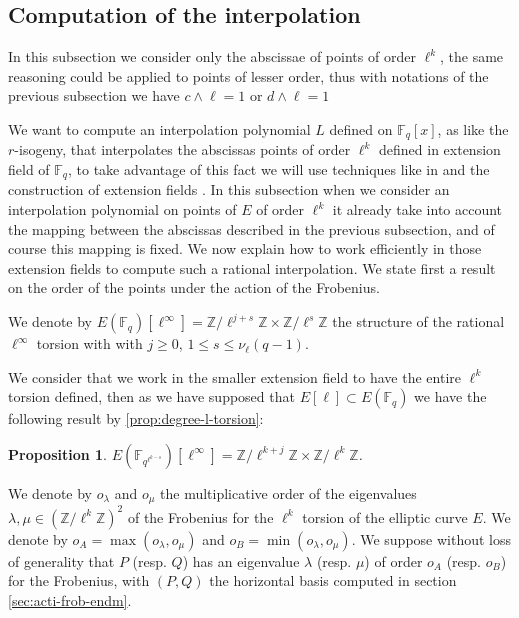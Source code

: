 \documentclass{lms}
\newtheorem{prop}[thm]{Proposition}
\begin{document}

\subsection{Computation of the interpolation}
In this subsection we consider only the abscissae of points of order $\ell^k$, the same reasoning could be applied to points of lesser order, thus with notations of the previous subsection we have $c \wedge \ell =1$ or $d \wedge \ell =1$ 

We want to compute an interpolation polynomial $L$ defined on $\mathbb{F}_q[x]$, as like the $r$-isogeny, that interpolates the abscissas points of order $\ell^k$ defined in extension field of $\mathbb{F}_q$, to take advantage of this fact we will use techniques like in \cite{enge+morain03} and the construction of extension fields \cite{DoSc12} \cite{DeDoSc13}. In this subsection when we consider an interpolation polynomial on points of $E$ of order $\ell^k$ it already take into account the mapping between the abscissas described in the previous subsection, and of course this mapping is fixed.
\newline
We now explain how to work efficiently in those extension fields to compute such a rational interpolation. 
We state first a result on the order of the points under the action of the Frobenius.

\begin{defi}
We denote by $E(\mathbb{F}_q)[\ell^{\infty}]=\mathbb{Z}/\ell^{j+s}
\mathbb{Z} \times \mathbb{Z}/\ell^{s} \mathbb{Z}$ the structure of the rational $\ell^{\infty}$ torsion with with $j \geqslant 0$, $1 \leqslant s \leqslant \nu_\ell(q-1)$. 
\end{defi}
We consider that we work in the smaller extension field to have the entire $\ell^k$ torsion defined, then as we have supposed that $E[\ell] \subset E(\mathbb{F}_q)$ we have the following result by \ref{prop:degree-l-torsion}:

\begin{prop}
 $E(\mathbb{F}_{q^{\ell^{k-s}}})[\ell^{\infty}]=\mathbb{Z}/\ell^{k+j}
\mathbb{Z} \times \mathbb{Z}/\ell^{k} \mathbb{Z}$. 
\end{prop}

\begin{defi}
We denote by $o_{\lambda}$ and $o_{\mu}$ the multiplicative order of the
eigenvalues $\lambda , \mu \in (\mathbb{Z}/\ell^k\mathbb{Z})^2$ of the Frobenius for the
$\ell^{k}$ torsion of the elliptic curve $E$.
\newline
We denote by $o_A=\max(o_{\lambda},o_{\mu})$ and $o_B=\min(o_{\lambda},o_{\mu})$.
We suppose without loss of generality that $P$ (resp. $Q$) has an eigenvalue $\lambda$ (resp. $\mu$) of order $o_A$ (resp. $o_B$) for the Frobenius, with $(P,Q)$ the horizontal basis computed in section \ref{sec:acti-frob-endm}.
\end{defi}
\end{document}

